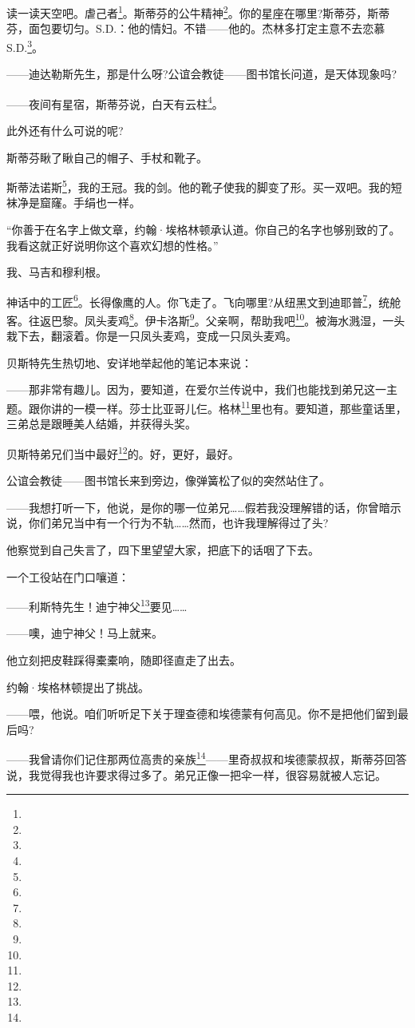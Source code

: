 \par 读一读天空吧。虐己者\footnote{}。斯蒂芬的公牛精神\footnote{}。你的星座在哪里?斯蒂芬，斯蒂芬，面包要切匀。S.D.：他的情妇。不错——他的。杰林多打定主意不去恋慕S.D.\footnote{}。
\par ——迪达勒斯先生，那是什么呀?公谊会教徒——图书馆长问道，是天体现象吗?
\par ——夜间有星宿，斯蒂芬说，白天有云柱\footnote{}。
\par 此外还有什么可说的呢?
\par 斯蒂芬瞅了瞅自己的帽子、手杖和靴子。
\par 斯蒂法诺斯\footnote{}，我的王冠。我的剑。他的靴子使我的脚变了形。买一双吧。我的短袜净是窟窿。手绢也一样。
\par “你善于在名字上做文章，约翰·埃格林顿承认道。你自己的名字也够别致的了。我看这就正好说明你这个喜欢幻想的性格。”
\par 我、马吉和穆利根。
\par 神话中的工匠\footnote{}。长得像鹰的人。你飞走了。飞向哪里?从纽黑文到迪耶普\footnote{}，统舱客。往返巴黎。凤头麦鸡\footnote{}。伊卡洛斯\footnote{}。父亲啊，帮助我吧\footnote{}。被海水溅湿，一头栽下去，翻滚着。你是一只凤头麦鸡，变成一只凤头麦鸡。
\par 贝斯特先生热切地、安详地举起他的笔记本来说：
\par ——那非常有趣儿。因为，要知道，在爱尔兰传说中，我们也能找到弟兄这一主题。跟你讲的一模一样。莎士比亚哥儿仨。格林\footnote{}里也有。要知道，那些童话里，三弟总是跟睡美人结婚，并获得头奖。
\par 贝斯特弟兄们当中最好\footnote{}的。好，更好，最好。
\par 公谊会教徒——图书馆长来到旁边，像弹簧松了似的突然站住了。
\par ——我想打听一下，他说，是你的哪一位弟兄……假若我没理解错的话，你曾暗示说，你们弟兄当中有一个行为不轨……然而，也许我理解得过了头?
\par 他察觉到自己失言了，四下里望望大家，把底下的话咽了下去。
\par 一个工役站在门口嚷道：
\par ——利斯特先生！迪宁神父\footnote{}要见……
\par ——噢，迪宁神父！马上就来。
\par 他立刻把皮鞋踩得橐橐响，随即径直走了出去。
\par 约翰·埃格林顿提出了挑战。
\par ——喂，他说。咱们听听足下关于理查德和埃德蒙有何高见。你不是把他们留到最后吗?
\par ——我曾请你们记住那两位高贵的亲族\footnote{}——里奇叔叔和埃德蒙叔叔，斯蒂芬回答说，我觉得我也许要求得过多了。弟兄正像一把伞一样，很容易就被人忘记。
